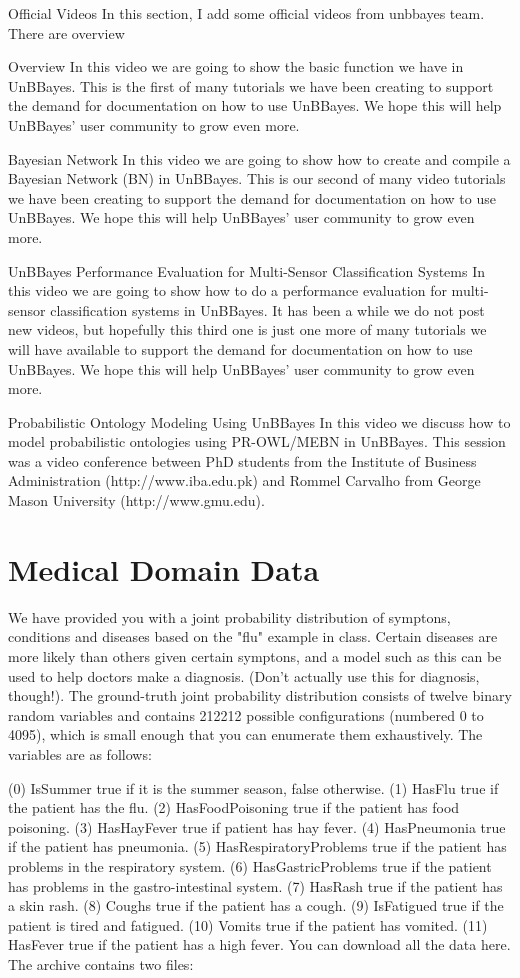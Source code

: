 Official Videos
In this section, I add some official videos from unbbayes team. There are overview

Overview
In this video we are going to show the basic function we have in UnBBayes. This is the first of many tutorials we have been creating to support the demand for documentation on how to use UnBBayes. We hope this will help UnBBayes' user community to grow even more.


Bayesian Network
In this video we are going to show how to create and compile a Bayesian Network (BN) in UnBBayes. This is our second of many video tutorials we have been creating to support the demand for documentation on how to use UnBBayes. We hope this will help UnBBayes' user community to grow even more.


UnBBayes Performance Evaluation for Multi-Sensor Classification Systems
In this video we are going to show how to do a performance evaluation for multi-sensor classification systems in UnBBayes. It has been a while we do not post new videos, but hopefully this third one is just one more of many tutorials we will have available to support the demand for documentation on how to use UnBBayes. We hope this will help UnBBayes' user community to grow even more.


Probabilistic Ontology Modeling Using UnBBayes
In this video we discuss how to model probabilistic ontologies using PR-OWL/MEBN in UnBBayes. This session was a video conference between PhD students from the Institute of Business Administration (http://www.iba.edu.pk) and Rommel Carvalho from George Mason University (http://www.gmu.edu).

\section{Medical Domain Data}

We have provided you with a joint probability distribution of symptons, conditions and diseases based on the "flu" example in class. Certain diseases are more likely than others given certain symptons, and a model such as this can be used to help doctors make a diagnosis. (Don't actually use this for diagnosis, though!). The ground-truth joint probability distribution consists of twelve binary random variables and contains 212212 possible configurations (numbered 0 to 4095), which is small enough that you can enumerate them exhaustively. The variables are as follows:

(0) IsSummer true if it is the summer season, false otherwise.
(1) HasFlu true if the patient has the flu.
(2) HasFoodPoisoning true if the patient has food poisoning.
(3) HasHayFever true if patient has hay fever.
(4) HasPneumonia true if the patient has pneumonia.
(5) HasRespiratoryProblems true if the patient has problems in the respiratory system.
(6) HasGastricProblems true if the patient has problems in the gastro-intestinal system.
(7) HasRash true if the patient has a skin rash.
(8) Coughs true if the patient has a cough.
(9) IsFatigued true if the patient is tired and fatigued.
(10) Vomits true if the patient has vomited.
(11) HasFever true if the patient has a high fever.
You can download all the data here. The archive contains two files:

